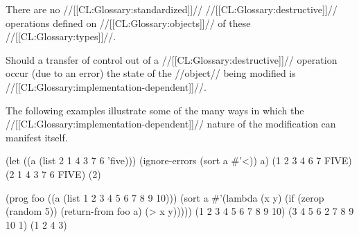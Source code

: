 There are no //[[CL:Glossary:standardized]]// //[[CL:Glossary:destructive]]// operations
defined on //[[CL:Glossary:objects]]// of these //[[CL:Glossary:types]]//.

\endlist

\endsubsection%






















Should a transfer of control out of a //[[CL:Glossary:destructive]]// operation occur
(\eg due to an error) the state of the //object// being modified is
//[[CL:Glossary:implementation-dependent]]//.


The following examples illustrate some of the many ways in which the
//[[CL:Glossary:implementation-dependent]]// nature of the modification can manifest
itself.

\code
 (let ((a (list 2 1 4 3 7 6 'five)))
   (ignore-errors (sort a #'<))
   a)
\EV (1 2 3 4 6 7 FIVE)
\OV (2 1 4 3 7 6 FIVE)
\OV (2)

 (prog foo ((a (list 1 2 3 4 5 6 7 8 9 10)))
   (sort a #'(lambda (x y) (if (zerop (random 5)) (return-from foo a) (> x y)))))
\EV (1 2 3 4 5 6 7 8 9 10)
\OV (3 4 5 6 2 7 8 9 10 1)
\OV (1 2 4 3)
\endcode

\endsubsubsection%

\endsubsection%

